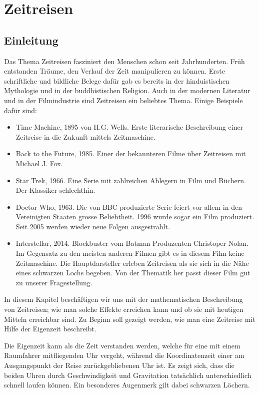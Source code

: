 \chapter{Zeitreisen\label{chapter:zeitreisen}}
\begin{refsection}
\section{Einleitung}
	Das Thema Zeitreisen fasziniert den Menschen schon seit Jahrhunderten. Früh entstanden Träume, den Verlauf der Zeit manipulieren zu können. Erste schriftliche und bildliche Belege dafür gab es bereits in der hinduistischen Mythologie und in der buddhistischen Religion. Auch in der modernen Literatur und in der Filmindustrie sind Zeitreisen ein beliebtes Thema. Einige Beispiele dafür sind: 
\begin{itemize}
    \item Time Machine, 1895 von H.G. Wells. Erste literarische Beschreibung einer Zeitreise in die Zukunft mittels Zeitmaschine.
    \item Back to the Future, 1985. Einer der bekannteren Filme über Zeitreisen mit Michael J. Fox.
    \item Star Trek, 1966. Eine Serie mit zahlreichen Ablegern in Film und Büchern. Der Klassiker schlechthin. 
    \item Doctor Who, 1963. Die von BBC produzierte Serie feiert vor allem in den Vereinigten Staaten grosse Beliebtheit. 1996 wurde sogar ein Film produziert. Seit 2005 werden wieder neue Folgen ausgestrahlt.
    \item Interstellar, 2014. Blockbuster vom Batman Produzenten Christoper Nolan. Im Gegensatz zu den meisten anderen Filmen gibt es in diesem Film keine Zeitmaschine. Die Hauptdarsteller erleben Zeitreisen als sie sich in die Nähe eines schwarzen Lochs begeben. Von der Thematik her passt dieser Film gut zu unserer Fragestellung.
\end{itemize}

In diesem Kapitel beschäftigen wir uns mit der mathematischen Beschreibung von Zeitreisen; wie man solche Effekte erreichen kann und ob sie mit heutigen Mitteln erreichbar sind. Zu Beginn soll gezeigt werden, wie man eine Zeitreise mit Hilfe der Eigenzeit beschreibt.

Die Eigenzeit kann als die Zeit verstanden werden, welche für eine mit einem Raumfahrer mitfliegenden Uhr vergeht, während die Koordinatenzeit einer am Ausgangspunkt der Reise zurück\-gebliebenen Uhr ist.
Es zeigt sich, dass die beiden Uhren durch Geschwindigkeit und Gravitation tatsächlich unterschiedlich schnell laufen können. Ein besonderes Augenmerk gilt dabei schwarzen Löchern. 


\end{refsection}
